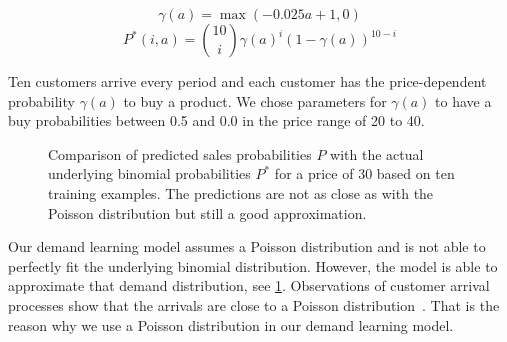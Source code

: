 $$
\gamma(a) = \max(-0.025 a + 1, 0)
$$
$$
P^*(i, a) = \binom{10}{i} \gamma(a)^i (1 - \gamma(a))^{10-i}
$$

Ten customers arrive every period and each customer has the price-dependent probability $\gamma(a)$ to buy a product.
We chose parameters for $\gamma(a)$ to have a buy probabilities between 0.5 and 0.0 in the price range of 20 to 40.

\begin{figure}[t]
	\caption[Comparison of Predicted Probabilites with Underlying Binomial Probabilities]{Comparison of predicted sales probabilities $P$ with the actual underlying binomial probabilities $P^*$ for a price of 30 based on ten training examples. The predictions are not as close as with the Poisson distribution but still a good approximation.}
	\label{fig:probs_binom}
\end{figure}

Our demand learning model assumes a Poisson distribution and is not able to perfectly fit the underlying binomial distribution.
However, the model is able to approximate that demand distribution, see \cref{fig:probs_binom}.
Observations of customer arrival processes show that the arrivals are close to a Poisson distribution~\cite{DBLP:journals/ior/Wolff82}.
That is the reason why we use a Poisson distribution in our demand learning model.

